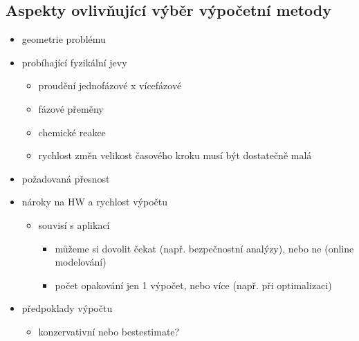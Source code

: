 \documentclass[letterpaper,10pt,czech]{sphinxmanual}
\begin{document}
\subsection{Aspekty ovlivňující výběr výpočetní metody}
\label{\detokenize{prednaska_19092022:aspekty-ovlivnujici-vyber-vypocetni-metody}}\begin{itemize}
\item {} 
\sphinxAtStartPar
geometrie problému

\item {} 
\sphinxAtStartPar
probíhající fyzikální jevy
\begin{itemize}
\item {} 
\sphinxAtStartPar
proudění \sphinxhyphen{} jednofázové x vícefázové

\item {} 
\sphinxAtStartPar
fázové přeměny

\item {} 
\sphinxAtStartPar
chemické reakce

\item {} 
\sphinxAtStartPar
rychlost změn \sphinxhyphen{} velikost časového kroku musí být dostatečně malá

\end{itemize}

\item {} 
\sphinxAtStartPar
požadovaná přesnost

\item {} 
\sphinxAtStartPar
nároky na HW a rychlost výpočtu
\begin{itemize}
\item {} 
\sphinxAtStartPar
souvisí s aplikací
\begin{itemize}
\item {} 
\sphinxAtStartPar
můžeme si dovolit čekat (např. bezpečnostní analýzy), nebo ne (on\sphinxhyphen{}line modelování)

\item {} 
\sphinxAtStartPar
počet opakování \sphinxhyphen{} jen 1 výpočet, nebo více (např. při optimalizaci)

\end{itemize}

\end{itemize}

\end{itemize}


\begin{itemize}
\item {} 
\sphinxAtStartPar
předpoklady výpočtu
\begin{itemize}
\item {} 
\sphinxAtStartPar
konzervativní nebo best\sphinxhyphen{}estimate?

\end{itemize}

\end{itemize}
\end{document}
